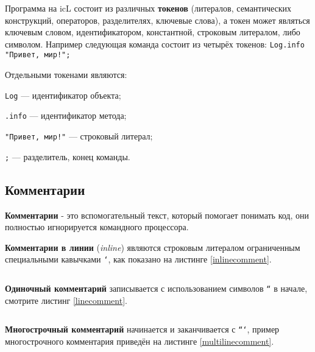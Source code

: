 Программа на icL состоит из различных \textbf{токенов} (литералов, семантических конструкций, операторов, разделителях, ключевые слова), а токен может являться ключевым словом, идентификатором, константной, строковым литералом, либо символом. Например следующая команда состоит из четырёх токенов: \texttt{Log.info "Привет, мир!";}

Отдельными токенами являются:

\begin{icItems}
\item
	\texttt{Log} — идентификатор объекта;
\item
	\texttt{.info} — идентификатор метода;
\item
	\texttt{"Привет, мир!"} — строковый литерал;
\item
	\texttt{;} — разделитель, конец команды.
\end{icItems}

\subsection{Комментарии}

\textbf{Комментарии} - это вспомогательный текст, который помогает понимать код, они полностью игнорируется командного процессора.

\textbf{Комментарии в линии} (\textit{inline}) являются строковым литералом ограниченным специальными кавычками \texttt{`}, как показано на листинге \ref{inlinecomment}.

\begin{sourcecode}
	\label{inlinecomment}
    \inputminted[linenos]{icl}{../sources/inlinecomment.icL}
\end{sourcecode}

\textbf{Одиночный комментарий} записывается с использованием символов \texttt{``} в начале, смотрите листинг \ref{linecomment}.

\begin{sourcecode}
	\label{linecomment}
    \inputminted[linenos]{icl}{../sources/linecomment.icL}
\end{sourcecode}

\textbf{Многострочный комментарий} начинается и заканчивается с \texttt{```}, пример многострочного комментария приведён на листинге \ref{multilinecomment}.

\begin{sourcecode}
	\label{multilinecomment}
    \inputminted[linenos]{icl}{../sources/multilinecomment.icL}
\end{sourcecode}

